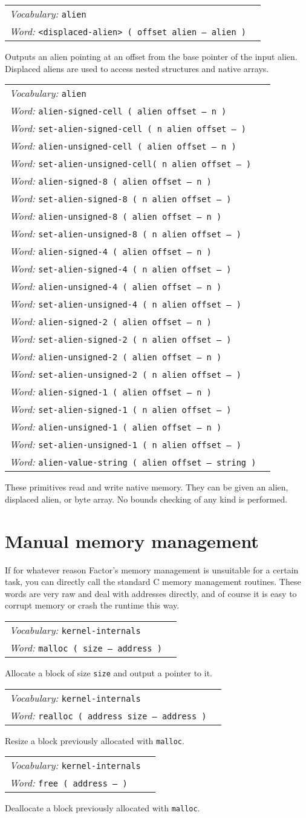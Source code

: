 \documentclass{book}
\newcommand{\vocabulary}[1]{\emph{Vocabulary:} \texttt{#1}&\\}
\newcommand{\ordinaryword}[2]{\index{\texttt{#1}}\emph{Word:} \texttt{#2}&\\}
\newcommand{\wordtable}[1]{


\begin{tabularx}{12cm}{lX}
\hline
#1
\hline
\end{tabularx}

}
\begin{document}
\wordtable{
\vocabulary{alien}
\ordinaryword{<displaced-alien>}{<displaced-alien> ( offset alien -- alien )}
}
Outputs an alien pointing at an offset from the base pointer of the input alien. Displaced aliens are used to access nested structures and native arrays.

\wordtable{
\vocabulary{alien}
\ordinaryword{alien-signed-cell}{alien-signed-cell ( alien offset -- n )}
\ordinaryword{set-alien-signed-cell}{set-alien-signed-cell ( n alien offset -- )}
\ordinaryword{alien-unsigned-cell}{alien-unsigned-cell ( alien offset -- n )}
\ordinaryword{set-alien-unsigned-cell}{set-alien-unsigned-cell( n alien offset -- )}
\ordinaryword{alien-signed-8}{alien-signed-8 ( alien offset -- n )}
\ordinaryword{set-alien-signed-8}{set-alien-signed-8 ( n alien offset -- )}
\ordinaryword{alien-unsigned-8}{alien-unsigned-8 ( alien offset -- n )}
\ordinaryword{set-alien-unsigned-8}{set-alien-unsigned-8 ( n alien offset -- )}
\ordinaryword{alien-signed-4}{alien-signed-4 ( alien offset -- n )}
\ordinaryword{set-alien-signed-4}{set-alien-signed-4 ( n alien offset -- )}
\ordinaryword{alien-unsigned-4}{alien-unsigned-4 ( alien offset -- n )}
\ordinaryword{set-alien-unsigned-4}{set-alien-unsigned-4 ( n alien offset -- )}
\ordinaryword{alien-signed-2}{alien-signed-2 ( alien offset -- n )}
\ordinaryword{set-alien-signed-2}{set-alien-signed-2 ( n alien offset -- )}
\ordinaryword{alien-unsigned-2}{alien-unsigned-2 ( alien offset -- n )}
\ordinaryword{set-alien-unsigned-2}{set-alien-unsigned-2 ( n alien offset -- )}
\ordinaryword{alien-signed-1}{alien-signed-1 ( alien offset -- n )}
\ordinaryword{set-alien-signed-1}{set-alien-signed-1 ( n alien offset -- )}
\ordinaryword{alien-unsigned-1}{alien-unsigned-1 ( alien offset -- n )}
\ordinaryword{set-alien-unsigned-1}{set-alien-unsigned-1 ( n alien offset -- )}
\ordinaryword{alien-value-string}{alien-value-string ( alien offset -- string )}
}
These primitives read and write native memory. They can be given an alien, displaced alien, or byte array. No bounds checking of any kind is performed.

\section{Manual memory management}\label{malloc}

If for whatever reason Factor's memory management is unsuitable for a certain task, you can
directly call the standard C memory management routines. These words are very raw and deal with addresses directly, and of course it is easy to corrupt memory or crash the runtime
this way.
\wordtable{
\vocabulary{kernel-internals}
\ordinaryword{malloc}{malloc ( size -- address )}
}
Allocate a block of size \verb|size| and output a pointer to it.
\wordtable{
\vocabulary{kernel-internals}
\ordinaryword{realloc}{realloc ( address size -- address )}
}
Resize a block previously allocated with \verb|malloc|.
\wordtable{
\vocabulary{kernel-internals}
\ordinaryword{free}{free ( address -- )}
}
Deallocate a block previously allocated with \verb|malloc|.
\end{document}
